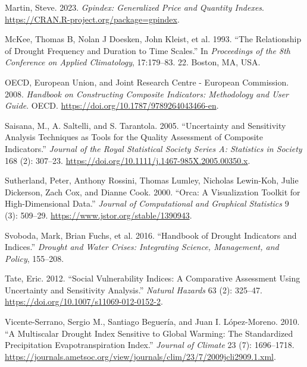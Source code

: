 \documentclass[
]{interact}
\newlength{\cslhangindent}
\newlength{\cslentryspacingunit} %
\newenvironment{CSLReferences}[2] %
 {%
  \setlength{\parindent}{0pt}
  \ifodd #1
  \let\oldpar\par
  \def\par{\hangindent=\cslhangindent\oldpar}
  \fi
  \setlength{\parskip}{#2\cslentryspacingunit}
 }%
 {}
\begin{document}
\begin{CSLReferences}{1}{0}
\leavevmode{}%
Martin, Steve. 2023. \emph{Gpindex: Generalized Price and Quantity
Indexes}. \url{https://CRAN.R-project.org/package=gpindex}.

\leavevmode{}%
McKee, Thomas B, Nolan J Doesken, John Kleist, et al. 1993. {``The
Relationship of Drought Frequency and Duration to Time Scales.''} In
\emph{Proceedings of the 8th Conference on Applied Climatology},
17:179--83. 22. Boston, MA, USA.

\leavevmode{}%
OECD, European Union, and Joint Research Centre - European Commission.
2008. \emph{Handbook on {Constructing} {Composite} {Indicators}:
{Methodology} and {User} {Guide}}. OECD.
\url{https://doi.org/10.1787/9789264043466-en}.

\leavevmode{}%
Saisana, M., A. Saltelli, and S. Tarantola. 2005. {``{Uncertainty and
Sensitivity Analysis Techniques as Tools for the Quality Assessment of
Composite Indicators}.''} \emph{Journal of the Royal Statistical Society
Series A: Statistics in Society} 168 (2): 307--23.
\url{https://doi.org/10.1111/j.1467-985X.2005.00350.x}.

\leavevmode{}%
Sutherland, Peter, Anthony Rossini, Thomas Lumley, Nicholas Lewin-Koh,
Julie Dickerson, Zach Cox, and Dianne Cook. 2000. {``Orca: {A}
{Visualization} {Toolkit} for {High}-{Dimensional} {Data}.''}
\emph{Journal of Computational and Graphical Statistics} 9 (3): 509--29.
\url{https://www.jstor.org/stable/1390943}.

\leavevmode{}%
Svoboda, Mark, Brian Fuchs, et al. 2016. {``Handbook of Drought
Indicators and Indices.''} \emph{Drought and Water Crises: Integrating
Science, Management, and Policy}, 155--208.

\leavevmode{}%
Tate, Eric. 2012. {``Social Vulnerability Indices: A Comparative
Assessment Using Uncertainty and Sensitivity Analysis.''} \emph{Natural
Hazards} 63 (2): 325--47.
\url{https://doi.org/10.1007/s11069-012-0152-2}.

\leavevmode{}%
Vicente-Serrano, Sergio M., Santiago Beguería, and Juan I. López-Moreno.
2010. {``A {Multiscalar} {Drought} {Index} {Sensitive} to {Global}
{Warming}: {The} {Standardized} {Precipitation} {Evapotranspiration}
{Index}.''} \emph{Journal of Climate} 23 (7): 1696--1718.
\url{https://journals.ametsoc.org/view/journals/clim/23/7/2009jcli2909.1.xml}.


\end{CSLReferences}
\end{document}

